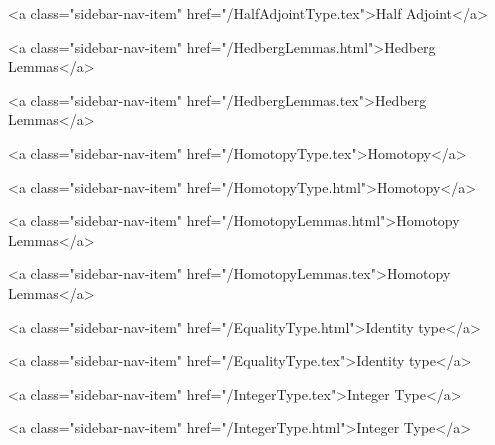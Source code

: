           <a class="sidebar-nav-item" href="/HalfAdjointType.tex">Half Adjoint</a>
        
      
    
      
        
          <a class="sidebar-nav-item" href="/HedbergLemmas.html">Hedberg Lemmas</a>
        
      
    
      
        
          <a class="sidebar-nav-item" href="/HedbergLemmas.tex">Hedberg Lemmas</a>
        
      
    
      
        
          <a class="sidebar-nav-item" href="/HomotopyType.tex">Homotopy</a>
        
      
    
      
        
          <a class="sidebar-nav-item" href="/HomotopyType.html">Homotopy</a>
        
      
    
      
        
          <a class="sidebar-nav-item" href="/HomotopyLemmas.html">Homotopy Lemmas</a>
        
      
    
      
        
          <a class="sidebar-nav-item" href="/HomotopyLemmas.tex">Homotopy Lemmas</a>
        
      
    
      
        
          <a class="sidebar-nav-item" href="/EqualityType.html">Identity type</a>
        
      
    
      
        
          <a class="sidebar-nav-item" href="/EqualityType.tex">Identity type</a>
        
      
    
      
        
          <a class="sidebar-nav-item" href="/IntegerType.tex">Integer Type</a>
        
      
    
      
        
          <a class="sidebar-nav-item" href="/IntegerType.html">Integer Type</a>
        
      
    
      
        
